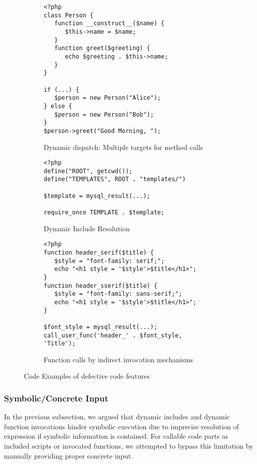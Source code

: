 \documentclass[sigconf]{acmart}
\begin{document}
\begin{figure}[t]
	\begin{subfigure}[b]{0.48\textwidth}
	
\begin{lstlisting}
<?php
class Person {
   function __construct__($name) {
      $this->name = $name;
   }
   function greet($greeting) {
      echo $greeting . $this->name;
   }
}

if (...) {
   $person = new Person("Alice");
} else {
   $person = new Person("Bob");
}
$person->greet("Good Morning, ");
\end{lstlisting}
	\caption{
		Dynamic dispatch: Multiple targets for method calls
		\label{fig:multi_target}
	}
	\end{subfigure}
	\vspace{2mm}
	\hfill
	\begin{subfigure}[b]{0.48\textwidth}

\begin{lstlisting}
<?php
define("ROOT", getcwd());
define("TEMPLATES", ROOT . "templates/")

$template = mysql_result(...);

require_once TEMPLATE . $template;
\end{lstlisting}
	\caption{
		Dynamic Include Resolution
		\label{fig:dynamic_includes}
	}
	\end{subfigure}
	\vspace{2mm}
	\hfill
	\begin{subfigure}[b]{0.48\textwidth}

\begin{lstlisting}
<?php
function header_serif($title) {
   $style = "font-family: serif;";
   echo "<h1 style = '$style'>$title</h1>";
}
function header_sserif($title) {
   $style = "font-family: sans-serif;";
   echo "<h1 style = '$style'>$title</h1>";
}

$font_style = mysql_result(...);
call_user_func('header_' . $font_style, 'Title');
\end{lstlisting}
	\caption{
		Function calls by indirect invocation mechanisms
		\label{fig:indirect_calls}
	}
	
	\end{subfigure}
	\caption{
		Code Examples of defective code features
		\label{fig:defective_code_features}
	}
\end{figure}

\subsubsection{Symbolic/Concrete Input}
In the previous subsection, we argued that dynamic includes and dynamic
function invocations hinder symbolic execution  due to imprecise resolution of
expression if symbolic information is contained. For callable code parts as
included scripts or invocated functions, we attempted to bypass this limitation
by manually providing proper concrete input.
\end{document}
